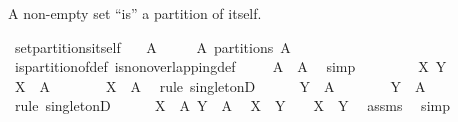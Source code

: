 \begin{isabellebody}
%
\endisadelimproof
%
\begin{isamarkuptext}%
A non-empty set ``is'' a partition of itself.%
\end{isamarkuptext}%
\isamarkuptrue%
\isamarkupfalse%
\ set{\isacharunderscore}partitions{\isacharunderscore}itself{\isacharcolon}\isanewline
\ \ \ {\isachardoublequoteopen}A\ {\isasymnoteq}\ {\isacharbraceleft}{\isacharbraceright}{\isachardoublequoteclose}\isanewline
\ \ \ {\isachardoublequoteopen}{\isacharbraceleft}A{\isacharbraceright}\ partitions\ A{\isachardoublequoteclose}%
\isadelimproof
\ %
\endisadelimproof
%
\isatagproof
{}\isamarkupfalse%
\ is{\isacharunderscore}partition{\isacharunderscore}of{\isacharunderscore}def\ is{\isacharunderscore}non{\isacharunderscore}overlapping{\isacharunderscore}def\isanewline
\isanewline
{}\isamarkupfalse%
\isanewline
\ \ \isamarkupfalse%
\ {\isachardoublequoteopen}{\isasymUnion}\ {\isacharbraceleft}A{\isacharbraceright}\ {\isacharequal}\ A{\isachardoublequoteclose}\ \isamarkupfalse%
\ simp\isanewline
\ \ \isacommand{{\isacharbraceleft}}\isamarkupfalse%
\isanewline
\ \ \ \ \isamarkupfalse%
\ X\ Y\isanewline
\ \ \ \ \isamarkupfalse%
\ {\isachardoublequoteopen}X\ {\isasymin}\ {\isacharbraceleft}A{\isacharbraceright}{\isachardoublequoteclose}\isanewline
\ \ \ \ \isamarkupfalse%
\ \isamarkupfalse%
\ {\isachardoublequoteopen}X\ {\isacharequal}\ A{\isachardoublequoteclose}\ \isamarkupfalse%
\ {\isacharparenleft}rule\ singletonD{\isacharparenright}\isanewline
\ \ \ \ \isamarkupfalse%
\ {\isachardoublequoteopen}Y\ {\isasymin}\ {\isacharbraceleft}A{\isacharbraceright}{\isachardoublequoteclose}\isanewline
\ \ \ \ \isamarkupfalse%
\ \isamarkupfalse%
\ {\isachardoublequoteopen}Y\ {\isacharequal}\ A{\isachardoublequoteclose}\ \isamarkupfalse%
\ {\isacharparenleft}rule\ singletonD{\isacharparenright}\isanewline
\ \ \ \ \isamarkupfalse%
\ {\isacharbackquoteopen}X\ {\isacharequal}\ A{\isacharbackquoteclose}\ {\isacharbackquoteopen}Y\ {\isacharequal}\ A{\isacharbackquoteclose}\ \isamarkupfalse%
\ {\isachardoublequoteopen}X\ {\isasyminter}\ Y\ {\isasymnoteq}\ {\isacharbraceleft}{\isacharbraceright}\ {\isasymlongleftrightarrow}\ X\ {\isacharequal}\ Y{\isachardoublequoteclose}\ \isamarkupfalse%
\ assms\ \isamarkupfalse%
\ simp\isanewline

\end{isabellebody}
